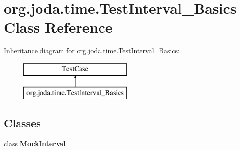 \hypertarget{classorg_1_1joda_1_1time_1_1_test_interval___basics}{\section{org.\-joda.\-time.\-Test\-Interval\-\_\-\-Basics Class Reference}
\label{classorg_1_1joda_1_1time_1_1_test_interval___basics}
}
Inheritance diagram for org.\-joda.\-time.\-Test\-Interval\-\_\-\-Basics\-:\begin{figure}[H]
\begin{center}
\leavevmode
\includegraphics[height=2.000000cm]{classorg_1_1joda_1_1time_1_1_test_interval___basics}
\end{center}
\end{figure}
\subsection*{Classes}
\begin{DoxyCompactItemize}
\item 
class {\bfseries Mock\-Interval}
\end{DoxyCompactItemize}

